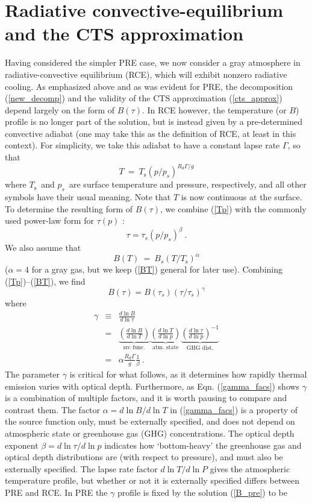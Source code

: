 \documentclass{ametsoc}
\newcommand{\beqn}{\begin{equation}}
\newcommand{\eeqn}{\end{equation}}
\newcommand{\beqa}{\begin{eqnarray}}
\newcommand{\eeqa}{\end{eqnarray}}
\newcommand{\eqnref}[1]{(\ref{#1})}
\newcommand{\der}[2]{\ensuremath{\frac{d #1}{d #2}}}
\newcommand{\Rd}{\ensuremath{R_d}}
\newcommand{\Ts}{\ensuremath{T_\mathrm{s}}}
\newcommand{\ps}{\ensuremath{p_s}}
\newcommand{\taus}{\ensuremath{\tau_s}}
\newcommand{\Bs}{\ensuremath{B_s}}
\begin{document}
\section{Radiative convective-equilibrium and the CTS approximation} \label{sec_rce}
Having considered the simpler PRE case, we now consider a gray atmosphere in radiative-convective equilibrium (RCE), which will exhibit nonzero radiative cooling. As emphasized above and as was evident for PRE, the decomposition \eqnref{new_decomp} and the validity of the CTS approximation \eqnref{cts_approx} depend largely on the form of $B(\tau)$. In RCE however,  the temperature (or $B$) profile is no longer part of the solution, but is instead given by a pre-determined convective adiabat (one may take this as the definition of RCE, at least in this context). For simplicity, we take this adiabat to have a constant lapse rate $\Gamma$, so that  
\beqn
	T \ = \ \Ts(p/\ps)^{\Rd\Gamma/g} 
	\label{Tp}
\eeqn
where \Ts\ and \ps\ are surface temperature and pressure, respectively, and all other symbols have their usual meaning. Note that $T$ is now continuous at the surface. To determine the resulting form of  $B(\tau)$, we combine \eqnref{Tp} with the commonly used power-law form for $\tau(p)$ \citep[e.g.][]{cronin2015b,robinson2012,frierson2006}:
 \beqn
 	\tau = \taus(p/\ps)^\beta  \ .
	\label{taup}
\eeqn 
We also assume that  
\beqn
	B(T)\ = \ \Bs(T/\Ts)^\alpha
	\label{BT}
\eeqn
($\alpha=4$ for a gray gas, but we keep \eqnref{BT} general for later use). Combining \eqnref{Tp}--\eqnref{BT}, we find
\beqn
	B(\tau) = B(\taus)(\tau/\taus)^\gamma
	\label{Btau1}
\eeqn
 where
 \begin{subequations}
	  \beqa
 		\gamma & \equiv & \der{\ln B}{\ln \tau} \label{gamma_def} \\[5pt]
					 &    = 	   & \underbrace{\left(\der{\ln B}{\ln T}\right)}_{\text{src func.}} \underbrace{\left(\der{\ln T}{\ln p}\right)}_{\text{atm. state}}\underbrace{\left(\der{\ln\tau}{\ln p}\right)^{-1}}_{\text{GHG dist.}} 
					 						\label{gamma_facs} \\[5pt]
				 	&    = 	   &  \alpha  \frac{R_d\Gamma}{g} \frac{1}{\beta} \ . \label{gamma_rce}
	\eeqa
	\label{gamma_eqns}
\end{subequations}
The parameter $\gamma$ is critical for what follows, as it determines how rapidly thermal emission varies with optical depth. Furthermore, as Eqn. \eqnref{gamma_facs} shows $\gamma$ is a combination of multiple factors, and it is worth pausing to compare and contrast them. The factor $\alpha = d \ln B/ d \ln T$ in \eqnref{gamma_facs}  is a property of the source function only, must be externally specified, and does not depend on atmospheric state or greenhouse gas (GHG) concentrations. The optical depth exponent $\beta = d\ln \tau/d \ln p$ indicates how `bottom-heavy' the greenhouse gas and optical depth distributions are (with respect to pressure), and must also be externally specified.  The lapse rate factor $d \ln T/ d\ln P$ gives the atmospheric temperature profile, but whether or not it is externally specified differs between PRE and RCE. In PRE the $\gamma$ profile is fixed by the solution \eqnref{B_pre} to be 
\end{document}
